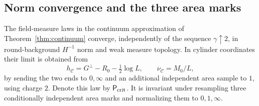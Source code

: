 \subsection{Norm convergence and the three area marks}\label{cont:marked-limit}

\begin{proposition}\label{cont:limit-law}
The field-measure laws in the continuum approximation of
Theorem~\ref{thm:continuum} converge, independently of the sequence
$\gamma\uparrow2$, in round-background $H^{-1}$ norm and weak measure
topology.  In cylinder coordinates their limit is obtained from
\begin{equation}\label{eq:original-2}
 h_{\mathcal C}=G^\perp-R_0-\tfrac12\log L,
 \qquad \nu_{\mathcal C}=M_0/L,
\end{equation}
by sending the two ends to $0,\infty$ and an additional independent area
sample to $1$, using charge $2$.  Denote this law by $\mathsf P_{\rm crit}$.
It is invariant under resampling three conditionally independent area marks
and normalizing them to $0,1,\infty$.
\end{proposition}

